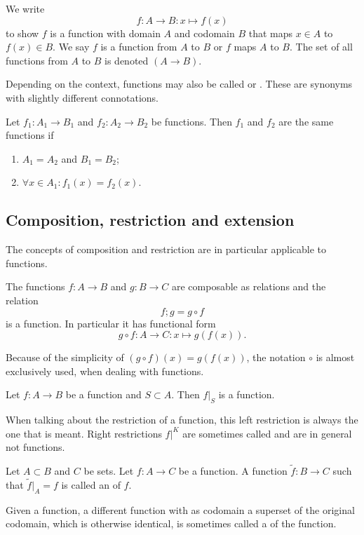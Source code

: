\begin{note}
We write
\[f:A \to B: x\mapsto f(x) \]
to show $f$ is a function with domain $A$ and codomain $B$ that maps $x\in A$ to $f(x)\in B$. We say $f$ is a function from $A$ to $B$ or $f$ maps $A$ to $B$. The set of all functions from $A$ to $B$ is denoted $(A\to B)$.
\end{note}

Depending on the context, functions may also be called  or . These are synonyms with slightly different connotations.

\begin{lemma}
Let $f_1: A_1\to B_1$ and $f_2: A_2\to B_2$ be functions. Then $f_1$ and $f_2$ are the same functions if
\begin{enumerate}
\item $A_1 = A_2$ and $B_1 = B_2$;
\item $\forall x\in A_1: f_1(x) = f_2(x)$.
\end{enumerate}
\end{lemma}

\subsection{Composition, restriction and extension}
The concepts of composition and restriction are in particular applicable to functions.

\begin{lemma}
The functions $f:A\to B$ and $g:B\to C$ are composable as relations and the relation
\[ f;g = g\circ f \]
is a function. In particular it has functional form
\[ g\circ f: A\to C: x\mapsto g(f(x)). \]
\end{lemma}
Because of the simplicity of $(g\circ f)(x) = g(f(x))$, the notation $\circ$ is almost exclusively used, when dealing with functions.

\begin{lemma}
Let $f: A\to B$ be a function and $S\subset A$. Then $f|_S$ is a function.
\end{lemma}
When talking about the restriction of a function, this left restriction is always the one that is meant. Right restrictions $f|^K$ are sometimes called  and are in general not functions.

\begin{definition}
Let $A\subset B$ and $C$ be sets. Let $f: A\to C$ be a function. A function $\tilde{f}: B\to C$ such that $\tilde{f}|_A = f$ is called an  of $f$.
\end{definition}
Given a function, a different function with as codomain a superset of the original codomain, which is otherwise identical, is sometimes called a  of the function.

